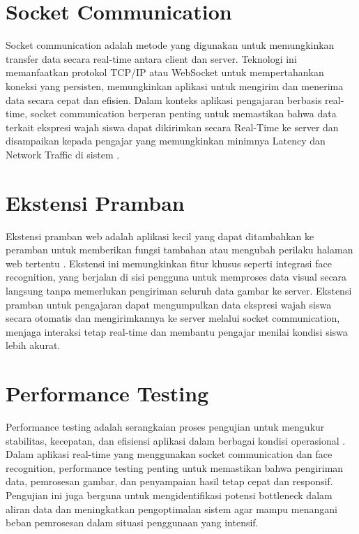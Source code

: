 \section{Socket Communication}
Socket communication adalah metode yang digunakan untuk memungkinkan transfer data secara real-time antara client dan server. Teknologi ini memanfaatkan protokol TCP/IP atau WebSocket untuk mempertahankan koneksi yang persisten, memungkinkan aplikasi untuk mengirim dan menerima data secara cepat dan efisien. Dalam konteks aplikasi pengajaran berbasis real-time, socket communication berperan penting untuk memastikan bahwa data terkait ekspresi wajah siswa dapat dikirimkan secara Real-Time ke server dan disampaikan kepada pengajar yang memungkinkan minimnya Latency dan Network Traffic di sistem \parencite{ogundeyiWebSocketRealTime2019}.

\section{Ekstensi Pramban}
Ekstensi pramban web adalah aplikasi kecil yang dapat ditambahkan ke peramban untuk memberikan fungsi tambahan atau mengubah perilaku halaman web tertentu \parencite{jinImpactExtensionsBrowser2024}. Ekstensi ini memungkinkan fitur khusus seperti integrasi face recognition, yang berjalan di sisi pengguna untuk memproses data visual secara langsung tanpa memerlukan pengiriman seluruh data gambar ke server. Ekstensi pramban untuk pengajaran dapat mengumpulkan data ekspresi wajah siswa secara otomatis dan mengirimkannya ke server melalui socket communication, menjaga interaksi tetap real-time dan membantu pengajar menilai kondisi siswa lebih akurat.

\section{Performance Testing}
Performance testing adalah serangkaian proses pengujian untuk mengukur stabilitas, kecepatan, dan efisiensi aplikasi dalam berbagai kondisi operasional \parencite{jinImpactExtensionsBrowser2024}. Dalam aplikasi real-time yang menggunakan socket communication dan face recognition, performance testing penting untuk memastikan bahwa pengiriman data, pemrosesan gambar, dan penyampaian hasil tetap cepat dan responsif. Pengujian ini juga berguna untuk mengidentifikasi potensi bottleneck dalam aliran data dan meningkatkan pengoptimalan sistem agar mampu menangani beban pemrosesan dalam situasi penggunaan yang intensif.
